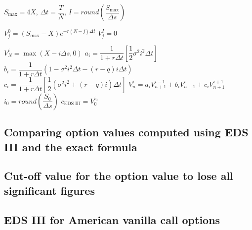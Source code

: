 \begin{algorithm}[H]
	$S_{\max} = 4X$, 
	$\Delta t = \dfrac{T}{N}$, 
	$I = round \left ( \dfrac{S_{\max}}{\Delta s} \right)$\;
	
	 {
		$V^{0}_{j} = (S_{\max} - X)e^{-r(N-j) \Delta t}$\;
		$V^{I}_{j} = 0$\;
	}
	
	 {
		$V^{i}_{N} = \max(X - i\Delta s, 0)$\;
		$a_i = \dfrac{1}{1 + r \Delta t} \left [\dfrac{1}{2} \sigma^2 i^2 \Delta t \right ]$\;
		$b_i = \dfrac{1}{1 + r \Delta t} \left (1 - \sigma^2 i^2 \Delta t - (r-q) i \Delta t \right )$\;
		$c_i = \dfrac{1}{1 + r \Delta t} \left [ \dfrac{1}{2} ( \sigma^2 i^2 + (r-q)i) \Delta t \right ]$\;
		 {
			$V_n^i = a_i V^{i - 1}_{n+1} + b_i V^i_{n+1} + c_i V^{i+1}_{n+1}$ \;
		}
	}
	$i_0 = round \left (\dfrac{S_0}{\Delta s} \right )$\;
	$c_{\text{EDS III}} = V_0^{i_0}$\;
	
\end{algorithm}


\subsection{Comparing option values computed using EDS III and the exact formula}

\subsection{Cut-off value for the option value to lose all significant figures}

\subsection{EDS III for American vanilla call options}


